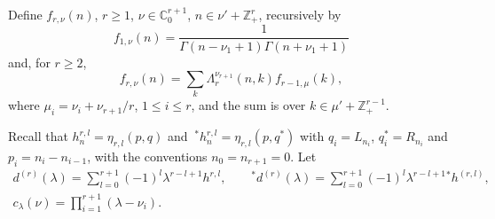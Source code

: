 \documentclass[pdftex]{sigma}
\theoremstyle{definition}
\newcommand{\C}{{\mathbb C}}
\newcommand\Z{{\mathbb Z}}
\begin{document}
Define $f_{r,\nu}(n)$, $r\ge 1$, $\nu\in\C_0^{r+1}$, $n\in \nu'+\Z_+^{r}$, recursively by
\[ f_{1,\nu}(n) =\frac1{\Gamma(n-\nu_1+1) \Gamma(n+\nu_1+1)}\]
and, for $r\ge 2$,
\begin{equation}\label{def-fr}
f_{r,\nu}(n) =\sum_{k} \Lambda^{\nu_{r+1}}_{r}(n,k) f_{r-1,\mu}(k),
\end{equation}
where $\mu_i=\nu_i+\nu_{r+1}/r$, $1\le i\le r$, and the sum is over $k\in\mu'+ \Z_+^{r-1}$.

Recall that $h^{r,l}_n =\eta_{r,l}(p,q)$ and $~^*\! h^{r,l}_n =\eta_{r,l}(p,q^*)$
with $q_i=L_{n_i}$, $q^*_i=R_{n_i}$ and $p_i=n_i-n_{i-1}$, with the
conventions $n_0=n_{r+1}=0$. Let
\begin{gather*}
d^{(r)}(\lambda)=\sum_{l=0}^{r+1} (-1)^l \lambda^{r-l+1} h^{r,l},\qquad
 {}^*\! d^{(r)}(\lambda)=\sum_{l=0}^{r+1} (-1)^l \lambda^{r-l+1} {}^*\! h^{(r,l)},\\
c_\lambda(\nu)=\prod_{i=1}^{r+1} (\lambda-\nu_i).
\end{gather*}
\end{document}
